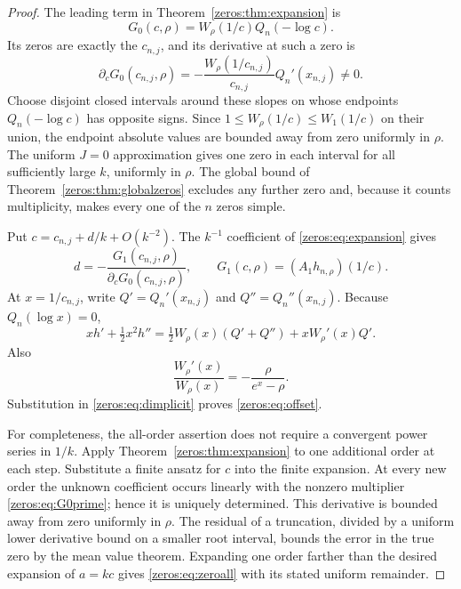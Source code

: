 \begin{proof}
The leading term in Theorem~\ref{zeros:thm:expansion} is
\[
 G_0(c,\rho)=W_\rho(1/c)Q_n(-\log c).
\]
Its zeros are exactly the $c_{n,j}$, and its derivative at such a zero is
\begin{equation}\label{zeros:eq:G0prime}
 \partial_cG_0(c_{n,j},\rho)
      =-\frac{W_\rho(1/c_{n,j})}{c_{n,j}}Q_n'(x_{n,j})\neq0.
\end{equation}
Choose disjoint closed intervals around these slopes on whose endpoints $Q_n(-\log c)$ has opposite signs. Since $1\leq W_\rho(1/c)\leq W_1(1/c)$ on their union, the endpoint absolute values are bounded away from zero uniformly in $\rho$. The uniform $J=0$ approximation gives one zero in each interval for all sufficiently large $k$, uniformly in $\rho$. The global bound of Theorem~\ref{zeros:thm:globalzeros} excludes any further zero and, because it counts multiplicity, makes every one of the $n$ zeros simple.

Put $c=c_{n,j}+d/k+O(k^{-2})$. The $k^{-1}$ coefficient of \eqref{zeros:eq:expansion} gives
\begin{equation}\label{zeros:eq:dimplicit}
 d=-\frac{G_1(c_{n,j},\rho)}{\partial_cG_0(c_{n,j},\rho)},
 \qquad G_1(c,\rho)=(A_1h_{n,\rho})(1/c).
\end{equation}
At $x=1/c_{n,j}$, write $Q'=Q_n'(x_{n,j})$ and $Q''=Q_n''(x_{n,j})$. Because $Q_n(\log x)=0$,
\[
 xh'+\tfrac12x^2h''
   =\tfrac12W_\rho(x)(Q'+Q'')+xW_\rho'(x)Q'.
\]
Also
\[
 \frac{W_\rho'(x)}{W_\rho(x)}=-\frac{\rho}{e^x-\rho}.
\]
Substitution in \eqref{zeros:eq:dimplicit} proves \eqref{zeros:eq:offset}.

For completeness, the all-order assertion does not require a convergent power series in $1/k$. Apply Theorem~\ref{zeros:thm:expansion} to one additional order at each step. Substitute a finite ansatz for $c$ into the finite expansion. At every new order the unknown coefficient occurs linearly with the nonzero multiplier \eqref{zeros:eq:G0prime}; hence it is uniquely determined. This derivative is bounded away from zero uniformly in $\rho$. The residual of a truncation, divided by a uniform lower derivative bound on a smaller root interval, bounds the error in the true zero by the mean value theorem. Expanding one order farther than the desired expansion of $a=kc$ gives \eqref{zeros:eq:zeroall} with its stated uniform remainder.
\end{proof}

